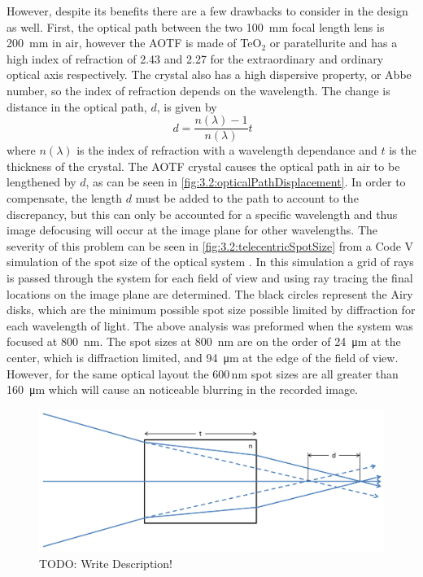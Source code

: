 
However, despite its benefits there are a few drawbacks to consider in the design as well. First, the optical path between the two 100~mm focal length lens is 200~mm in air, however the AOTF is made of TeO$_{2}$  or paratellurite and has a high index of refraction of 2.43 and 2.27 for the extraordinary and ordinary optical axis respectively. The crystal also has a high dispersive property, or Abbe number, so the index of refraction depends on the wavelength. The change is distance in the optical path, $d$, is given by
\begin{equation}
    \ d = \frac{n(\lambda)-1}{n(\lambda)}t
    \label{eqn:3.2:opticalPathDisplacement}
\end{equation}
where $n(\lambda)$ is the index of refraction with a wavelength dependance and $t$ is the thickness of the crystal. The AOTF crystal causes the optical path in air to be lengthened by $d$, as can be seen in \autoref{fig:3.2:opticalPathDisplacement}. In order to compensate, the length $d$ must be added to the path to account to the discrepancy, but this can only be accounted for a specific wavelength and thus image defocusing will occur at the image plane for other wavelengths. The severity of this problem can be seen in \autoref{fig:3.2:telecentricSpotSize} from a Code V simulation of the spot size of the optical system . In this simulation a grid of rays is passed through the system for each field of view and using ray tracing the final locations on the image plane are determined. The black circles represent the Airy disks, which are the minimum possible spot size possible limited by diffraction for each wavelength of light. The above analysis was preformed when the system was focused at 800~nm. The spot sizes at 800~nm are on the order of 24~\si{\micro\meter} at the center, which is diffraction limited, and 94~\si{\micro\meter} at the edge of the field of view. However, for the same optical layout the 600\,nm spot sizes are all greater than 160~\si{\micro\meter} which will cause an noticeable blurring in the recorded image.

\begin{figure}[h!]
    \begin{center}
    \includegraphics[width=1.0\textwidth]{./Images/3-2-OpticalPathDisplacement.pdf}
    \caption[Telecentric Optical Path Displacement]{TODO: Write Description!}
    \label{fig:3.2:opticalPathDisplacement}
    \end{center}
\end{figure}


